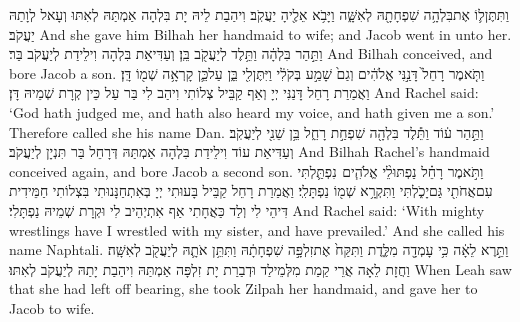 {וַתִּתֶּן\maqqaf ל֛וֹ אֶת\maqqaf בִּלְהָ֥ה שִׁפְחָתָ֖הּ לְאִשָּׁ֑ה וַיָּבֹ֥א אֵלֶ֖יהָ יַעֲקֹֽב׃}
{וִיהַבַת לֵיהּ יָת בִּלְהָה אַמְתַּהּ לְאִתּוּ וְעָאל לְוָתַהּ יַעֲקֹב׃}
{And she gave him Bilhah her handmaid to wife; and Jacob went in unto her.}{}
{וַתַּ֣הַר בִּלְהָ֔ה וַתֵּ֥לֶד לְיַעֲקֹ֖ב בֵּֽן׃}
{וְעַדִּיאַת בִּלְהָה וִילֵידַת לְיַעֲקֹב בַּר׃}
{And Bilhah conceived, and bore Jacob a son.}{}
{וַתֹּ֤אמֶר רָחֵל֙ דָּנַ֣נִּי אֱלֹהִ֔ים וְגַם֙ שָׁמַ֣ע בְּקֹלִ֔י וַיִּתֶּן\maqqaf לִ֖י בֵּ֑ן עַל\maqqaf כֵּ֛ן קָרְאָ֥ה שְׁמ֖וֹ דָּֽן׃}
{וַאֲמַרַת רָחֵל דָּנַנִּי יְיָ וְאַף קַבֵּיל צְלוֹתִי וִיהַב לִי בַּר עַל כֵּין קְרָת שְׁמֵיהּ דָּן׃}
{And Rachel said: ‘God hath judged me, and hath also heard my voice, and hath given me a son.’ Therefore called she his name Dan.}{}
{וַתַּ֣הַר ע֔וֹד וַתֵּ֕לֶד בִּלְהָ֖ה שִׁפְחַ֣ת רָחֵ֑ל בֵּ֥ן שֵׁנִ֖י לְיַעֲקֹֽב׃}
{וְעַדִּיאַת עוֹד וִילֵידַת בִּלְהָה אַמְתַּהּ דְּרָחֵל בַּר תִּנְיָן לְיַעֲקֹב׃}
{And Bilhah Rachel’s handmaid conceived again, and bore Jacob a second son.}{}
{וַתֹּ֣אמֶר רָחֵ֗ל נַפְתּוּלֵ֨י אֱלֹהִ֧ים \pasek  נִפְתַּ֛לְתִּי עִם\maqqaf אֲחֹתִ֖י גַּם\maqqaf יָכֹ֑לְתִּי וַתִּקְרָ֥א שְׁמ֖וֹ נַפְתָּלִֽי׃}
{וַאֲמַרַת רָחֵל קַבֵּיל בָּעוּתִי יְיָ בְּאִתְחַנָּנוּתִי בִּצְלוֹתִי חַמֵּידִית דִּיהֵי לִי וְלַד כַּאֲחָתִי אַף אִתְיְהֵיב לִי וּקְרָת שְׁמֵיהּ נַפְתָּלִי׃}
{And Rachel said: ‘With mighty wrestlings have I wrestled with my sister, and have prevailed.’ And she called his name Naphtali.}{}
{וַתֵּ֣רֶא לֵאָ֔ה כִּ֥י עָמְדָ֖ה מִלֶּ֑דֶת וַתִּקַּח֙ אֶת\maqqaf זִלְפָּ֣ה שִׁפְחָתָ֔הּ וַתִּתֵּ֥ן אֹתָ֛הּ לְיַעֲקֹ֖ב לְאִשָּֽׁה׃}
{וַחֲזָת לֵאָה אֲרֵי קַמַת מִלְּמֵילַד וּדְבַרַת יָת זִלְפָּה אַמְתַּהּ וִיהַבַת יָתַהּ לְיַעֲקֹב לְאִתּוּ׃}
{When Leah saw that she had left off bearing, she took Zilpah her handmaid, and gave her to Jacob to wife.}{}
